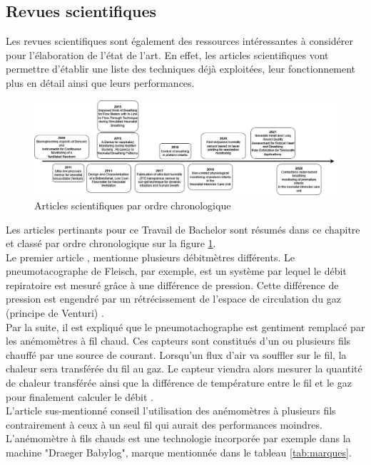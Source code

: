 \subsection{Revues scientifiques}
Les revues scientifiques sont également des ressources intéressantes à considérer pour l'élaboration de l'état de l'art. En effet, les 
articles scientifiques vont permettre d'établir une liste des techniques déjà exploitées, leur fonctionnement plus en détail ainsi que leurs 
performances. \\
\begin{figure}[H]
    \centering
    \includegraphics[scale = 0.3]{images/DRP_Etat_de_l_art.png}
    \caption{Articles scientifiques par ordre chronologique}
    \label{fig:articlesChrono}
\end{figure}

Les articles pertinants pour ce Travail de Bachelor sont résumés dans ce chapitre et classé par ordre chronologique sur la figure 
\ref{fig:articlesChrono}. \\

Le premier article \cite{rolfe_bioengineering_2009}, mentionne plusieurs débitmètres différents. Le pneumotacographe de Fleisch, par exemple, est un 
système par lequel le débit repiratoire est mesuré grâce à une différence de pression. Cette différence de pression est engendré par 
un rétrécissement de l'espace de circulation du gaz (principe de Venturi) \cite{oberg_biomedical_2011}. \\

Par la suite, il est expliqué que le pneumotachographe est gentiment remplacé par les anémomètres à fil chaud. Ces capteurs sont 
constitués d'un ou plusieurs fils chauffé par une source de courant. Lorsqu'un flux d'air va souffler sur le fil, la chaleur sera 
transférée du fil au gaz. Le capteur viendra alors mesurer la quantité de chaleur transférée ainsi que la différence de température entre 
le fil et le gaz pour finalement calculer le débit \cite{oberg_biomedical_2011}. \\
L'article sus-mentionné conseil l'utilisation des anémomètres à plusieurs fils contrairement à ceux à un seul fil qui aurait des performances 
moindres. 
L'anémomètre à fils chauds est une technologie incorporée par exemple dans la machine "Draeger Babylog", marque mentionnée dans le tableau \ref{tab:marques}. \\


